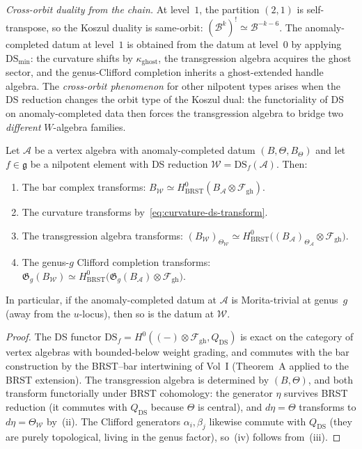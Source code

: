 \begin{construction}
\emph{Cross-orbit duality from the chain.}
At level~$1$, the partition $(2,1)$ is self-transpose, so
the Koszul duality is same-orbit:
$(\mathcal B^k)^!\simeq\mathcal B^{-k-6}$. The
anomaly-completed datum at level~$1$ is obtained from the
datum at level~$0$ by applying
$\mathrm{DS}_{\min}$: the curvature shifts by
$\kappa_{\mathrm{ghost}}$, the transgression algebra
acquires the ghost sector, and the genus-Clifford completion
inherits a ghost-extended handle algebra. The
\emph{cross-orbit phenomenon} for other nilpotent types arises
when the DS reduction changes the orbit type of the Koszul
dual: the functoriality of DS on anomaly-completed data
then forces the transgression algebra to bridge two
\emph{different} $W$-algebra families.
\end{construction}

\begin{theorem}
Let $\mathcal A$ be a vertex algebra with anomaly-completed
datum $(B,\Theta,B_\Theta)$ and let $f\in\mathfrak g$ be a
nilpotent element with DS reduction
$\mathcal W=\mathrm{DS}_f(\mathcal A)$. Then:
\begin{enumerate}[label=\textup{(\roman*)}]
\item The bar complex transforms:
 $B_{\mathcal W}\simeq H^0_{\mathrm{BRST}}
 (B_{\mathcal A}\otimes\mathcal F_{\mathrm{gh}})$.
\item The curvature transforms by~\eqref{eq:curvature-ds-transform}.
\item The transgression algebra transforms:
 $(B_{\mathcal W})_{\Theta_{\mathcal W}}
 \simeq
 H^0_{\mathrm{BRST}}\bigl(
 (B_{\mathcal A})_{\Theta_{\mathcal A}}
 \otimes\mathcal F_{\mathrm{gh}}
 \bigr)$.
\item The genus-$g$ Clifford completion transforms:
 $\mathfrak G_g(B_{\mathcal W})
 \simeq
 H^0_{\mathrm{BRST}}\bigl(
 \mathfrak G_g(B_{\mathcal A})
 \otimes\mathcal F_{\mathrm{gh}}
 \bigr)$.
\end{enumerate}
In particular, if the anomaly-completed datum at
$\mathcal A$ is Morita-trivial at genus~$g$ (away from the
$u$-locus), then so is the datum at $\mathcal W$.
\end{theorem}

\begin{proof}
The DS functor $\mathrm{DS}_f=H^0((-)\otimes
\mathcal F_{\mathrm{gh}},Q_{\mathrm{DS}})$ is exact on the
category of vertex algebras with bounded-below weight grading,
and commutes with the bar construction by the BRST--bar
intertwining of Vol~I (Theorem~A applied to the BRST
extension). The transgression algebra is determined by
$(B,\Theta)$, and both transform functorially under BRST
cohomology: the generator $\eta$ survives BRST reduction
(it commutes with $Q_{\mathrm{DS}}$ because $\Theta$ is
central), and $d\eta=\Theta$ transforms to
$d\eta=\Theta_{\mathcal W}$ by~(ii). The Clifford generators
$\alpha_i,\beta_j$ likewise commute with $Q_{\mathrm{DS}}$
(they are purely topological, living in the genus factor),
so~(iv) follows from~(iii).
\end{proof}

